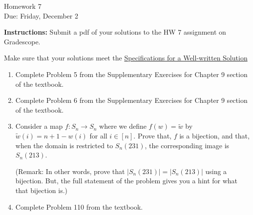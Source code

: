 \documentclass[12pt]{article}
\begin{document}
\begin{center}
{\Large Homework 7}\\
Due: Friday, December 2\\
\end{center}
{\bf Instructions:} Submit a pdf of your solutions to the HW 7 assignment on Gradescope. 

Make sure that your solutions meet the \href{https://docs.google.com/document/d/18LfQoqi6BsY2VdAlpC5xdYEA2rxSGoH0891nVec4_Os/edit?usp=sharing}{Specifications for a Well-written Solution} 

\begin{enumerate}
\item Complete Problem 5 from the Supplementary Exercises for Chapter 9 section of the textbook. 
\item Complete Problem 6 from the Supplementary Exercises for Chapter 9 section of the textbook. 
\item Consider a map $f:S_n\to S_n$ where we define $f(w)=\tilde{w}$ by $\tilde{w}(i)=n+1-w(i)$ for all $i\in [n]$.  Prove that, $f$ is a bijection, and that, when the domain is restricted to $S_n(231)$,  the corresponding image is  $S_n(213)$. 

(Remark: In other words, prove that $|S_n(231)|=|S_n(213)|$ using a bijection. But, the full statement of the problem gives you a hint for what that bijection is.)

\item Complete Problem 110 from the textbook.


\end{enumerate}
\end{document}
